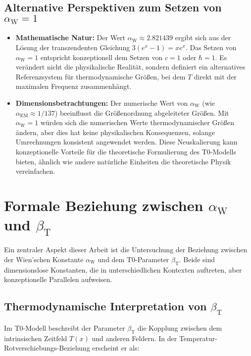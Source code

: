 \documentclass[12pt,a4paper]{article}
\newcommand{\Tfield}{T(x)}
\newcommand{\betaT}{\beta_{\text{T}}}
\newcommand{\alphaEM}{\alpha_{\text{EM}}}
\newcommand{\alphaW}{\alpha_{\text{W}}}
\begin{document}
	\subsection{Alternative Perspektiven zum Setzen von \(\alphaW = 1\)}
	\label{subsec:alternative_perspectives}
	
	\begin{itemize}
		\item \textbf{Mathematische Natur:} Der Wert \(\alphaW \approx 2.821439\) ergibt sich aus der Lösung der transzendenten Gleichung \(3(e^x - 1) = xe^x\). Das Setzen von \(\alphaW = 1\) entspricht konzeptionell dem Setzen von \(c = 1\) oder \(\hbar = 1\). Es verändert nicht die physikalische Realität, sondern definiert ein alternatives Referenzsystem für thermodynamische Größen, bei dem \(T\) direkt mit der maximalen Frequenz zusammenhängt.
		\item \textbf{Dimensionsbetrachtungen:} Der numerische Wert von \(\alphaW\) (wie \(\alphaEM \approx 1/137\)) beeinflusst die Größenordnung abgeleiteter Größen. Mit \(\alphaW = 1\) würden sich die numerischen Werte thermodynamischer Größen ändern, aber dies hat keine physikalischen Konsequenzen, solange Umrechnungen konsistent angewendet werden. Diese Neuskalierung kann konzeptionelle Vorteile für die theoretische Formulierung des T0-Modells bieten, ähnlich wie andere natürliche Einheiten die theoretische Physik vereinfachen.
	\end{itemize}
	
	\section{Formale Beziehung zwischen \(\alphaW\) und \(\betaT\)}
	\label{sec:relationship_alpha_beta}
	
	Ein zentraler Aspekt dieser Arbeit ist die Untersuchung der Beziehung zwischen der Wien'schen Konstante \(\alphaW\) und dem T0-Parameter \(\betaT\). Beide sind dimensionslose Konstanten, die in unterschiedlichen Kontexten auftreten, aber konzeptionelle Parallelen aufweisen.
	
	\subsection{Thermodynamische Interpretation von \(\betaT\)}
	\label{subsec:thermodynamic_beta}
	
	Im T0-Modell beschreibt der Parameter \(\betaT\) die Kopplung zwischen dem intrinsischen Zeitfeld \(\Tfield\) und anderen Feldern. In der Temperatur-Rotverschiebungs-Beziehung erscheint er als:
	
\end{document}
